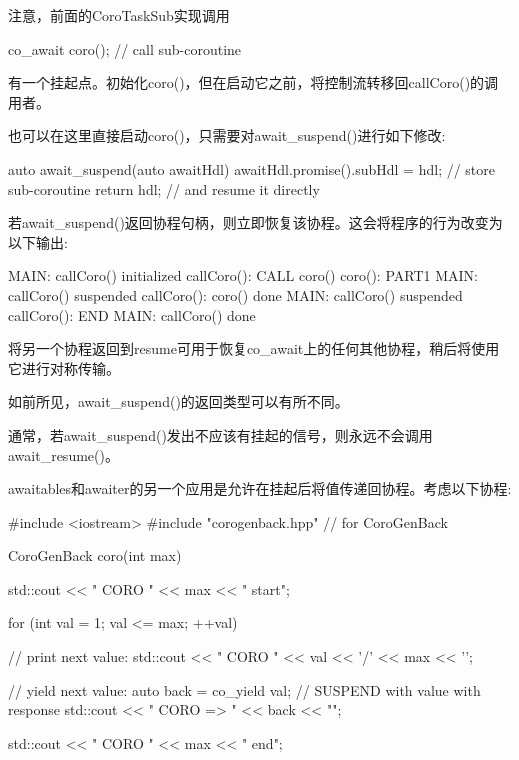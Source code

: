 
注意，前面的CoroTaskSub实现调用

\begin{cpp}
co_await coro(); // call sub-coroutine
\end{cpp}

有一个挂起点。初始化coro()，但在启动它之前，将控制流转移回callCoro()的调用者。

也可以在这里直接启动coro()，只需要对await\_suspend()进行如下修改:

\begin{cpp}
auto await_suspend(auto awaitHdl) {
	awaitHdl.promise().subHdl = hdl; // store sub-coroutine
	return hdl; // and resume it directly
}
\end{cpp}

若await\_suspend()返回协程句柄，则立即恢复该协程。这会将程序的行为改变为以下输出:

\begin{shell}
MAIN: callCoro() initialized
  callCoro(): CALL coro()
    coro(): PART1
MAIN: callCoro() suspended
  callCoro(): coro() done
MAIN: callCoro() suspended
  callCoro(): END
MAIN: callCoro() done
\end{shell}

将另一个协程返回到resume可用于恢复co\_await上的任何其他协程，稍后将使用它进行对称传输。

如前所见，await\_suspend()的返回类型可以有所不同。

通常，若await\_suspend()发出不应该有挂起的信号，则永远不会调用await\_resume()。


awaitables和awaiter的另一个应用是允许在挂起后将值传递回协程。考虑以下协程:


\begin{cpp}
#include <iostream>
#include "corogenback.hpp" // for CoroGenBack

CoroGenBack coro(int max)
{
	std::cout << "              CORO " << max << " start\n";

	for (int val = 1; val <= max; ++val) {
		// print next value:
		std::cout << " CORO " << val << '/' << max << '\n';

		// yield next value:
		auto back = co_yield val; // SUSPEND with value with response
		std::cout << "           CORO => " << back << "\n";
	}

	std::cout << "             CORO " << max << " end\n";
}
\end{cpp}

